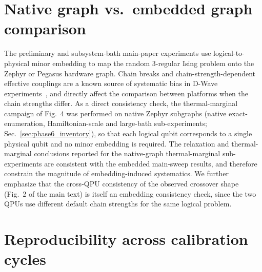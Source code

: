 \documentclass[aps,prapplied,reprint,superscriptaddress,floatfix,nofootinbib]{revtex4-2}
\begin{document}
\section{Native graph vs.\ embedded graph comparison}
\label{sec:native}

The preliminary and subsystem-bath main-paper experiments use logical-to-physical minor embedding to map the random 3-regular Ising problem onto the Zephyr or Pegasus hardware graph.
Chain breaks and chain-strength-dependent effective couplings are a known source of systematic bias in D-Wave experiments~\cite{marshall2020embedding}, and directly affect the comparison between platforms when the chain strengths differ.
As a direct consistency check, the thermal-marginal campaign of Fig.~4 was performed on native Zephyr subgraphs (native exact-enumeration, Hamiltonian-scale and large-bath sub-experiments; Sec.~\ref{sec:phase6_inventory}), so that each logical qubit corresponds to a single physical qubit and no minor embedding is required.
The relaxation and thermal-marginal conclusions reported for the native-graph thermal-marginal sub-experiments are consistent with the embedded main-sweep results, and therefore constrain the magnitude of embedding-induced systematics.
We further emphasize that the cross-QPU consistency of the observed crossover shape (Fig.~2 of the main text) is itself an embedding consistency check, since the two QPUs use different default chain strengths for the same logical problem.

\section{Reproducibility across calibration cycles}
\label{sec:reproducibility}
\end{document}
